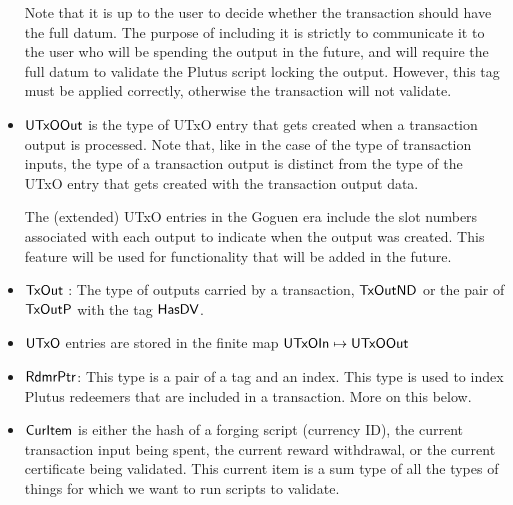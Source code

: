 \begin{itemize}
  Note that it is up to the user
  to decide whether the transaction should have the full datum. The purpose of
  including it is strictly to communicate it to the user who will be spending
  the output in the future, and will require the full datum to validate
  the Plutus script locking the output. However, this tag must be applied
  correctly, otherwise the transaction will not validate.

  \item $\mathsf{UTxOOut}$ is the type of UTxO entry that gets created when a transaction
  output is processed. Note that, like in the case of the type of transaction inputs,
  the type of a transaction output is distinct from the type of the
  UTxO entry that gets created with the transaction output data.

  The (extended) UTxO entries in the Goguen era include the slot numbers associated with each output
  to indicate when the output was created.
  This feature will be used for functionality that will be added in the future.

  \item $\mathsf{TxOut}$ : The type of outputs carried by a transaction,
  $\mathsf{TxOutND}$ or the pair of $\mathsf{TxOutP}$ with the tag $\mathsf{HasDV}$.

  \item $\mathsf{UTxO}$ entries are stored in the finite map $\mathsf{UTxOIn}\mapsto \mathsf{UTxOOut}$

  \item $\mathsf{RdmrPtr}$: This type is a pair of a tag and an index. This type is
  used to index Plutus redeemers that are included in a transaction. More on this
  below.

  \item $\mathsf{CurItem}$ is either the hash of a
  forging script (currency ID), the current transaction input being
  spent, the current reward
  withdrawal, or the current certificate being validated.
  This current item is a sum type of all the types of things for which we want to
  run scripts to validate.

\end{itemize}



